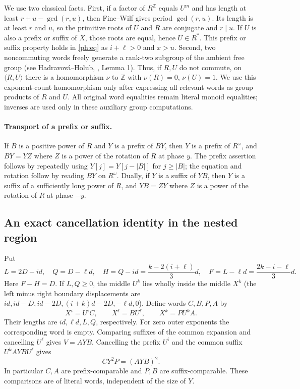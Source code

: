 We use two classical facts. First, if a factor of $R^{\mathbb Z}$ equals
$U^m$ and has length at least $r+u-\gcd(r,u)$, then Fine--Wilf gives
period $\gcd(r,u)$. Its length is at least $r$ and $u$, so the primitive
roots of $U$ and $R$ are conjugate and $r\mid u$. If $U$ is also a prefix
or suffix of $X$, those roots are equal, hence $U\in R^*$. This prefix
or suffix property holds in \eqref{ph:eq} as $i+\ell>0$ and $x>u$.
Second, two noncommuting words freely generate a rank-two subgroup of
the ambient free group (see Hadravov\'a--Holub, \cite{hh}, Lemma 1).
Thus, if $R,U$ do not commute, on $\langle R,U\rangle$ there is a
homomorphism $\nu$ to $\mathbb Z$ with $\nu(R)=0$, $\nu(U)=1$.
We use this exponent-count homomorphism only after expressing all
relevant words as group products of $R$ and $U$. All original word
equalities remain literal monoid equalities; inverses are used only in
these auxiliary group computations.

\paragraph{Transport of a prefix or suffix.}
If $B$ is a positive power of $R$ and $Y$ is a prefix of $BY$, then $Y$
is a prefix of $R^\omega$, and $BY=YZ$ where $Z$ is a power of the
rotation of $R$ at phase $y$. The prefix assertion follows by repeatedly
using $Y[j]=Y[j-|B|]$ for $j\ge |B|$; the equation and rotation follow
by reading $BY$ on $R^\omega$. Dually, if $Y$ is a suffix of $YB$,
then $Y$ is a suffix of a sufficiently long power of $R$, and $YB=ZY$
where $Z$ is a power of the rotation of $R$ at phase $-y$.

\subsection{An exact cancellation identity in the nested region}
Put
\[
 L=2D-id,\quad Q=D-\ell d,\quad
 H=Q-id=\frac{k-2(i+\ell)}3d,\quad
 F=L-\ell d=\frac{2k-i-\ell}3d.
\]
Here $F-H=D$. If $L,Q\ge0$, the middle $U^k$ lies wholly inside the
middle $X^k$ (the left minus right boundary displacements are
$id,id-D,id-2D,(i+k)d-2D,-\ell d,0$). Define words $C,B,P,A$ by
\begin{equation}\label{ph:factor}
 X^i=U^i C,\qquad X^\ell=B U^\ell,\qquad
 X^k=P U^k A.
\end{equation}
Their lengths are $id,\ell d,L,Q$, respectively. For zero outer
exponents the corresponding word is empty. Comparing suffixes of the
common expansion and cancelling $U^\ell$ gives $V=AYB$. Cancelling the
prefix $U^i$ and the common suffix $U^k AYB U^\ell$ gives
\begin{equation}\label{ph:cancel}
 C Y^2 P=(A Y B)^2.
\end{equation}
In particular $C,A$ are prefix-comparable and $P,B$ are suffix-comparable.
These comparisons are of literal words, independent of the size of $Y$.

